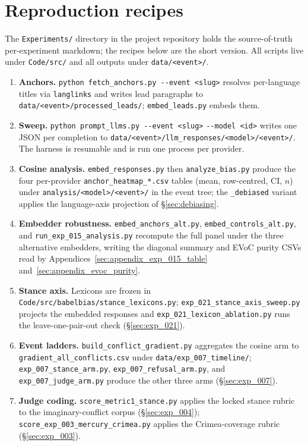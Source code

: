 \section{Reproduction recipes}\label{sec:appendix_reproduce}

The \verb|Experiments/| directory in the project repository holds
the source-of-truth per-experiment markdown; the recipes below are
the short version. All scripts live under \verb|Code/src/| and all
outputs under \verb|data/<event>/|.

{\sloppy
\begin{enumerate}
  \item \textbf{Anchors.} \verb|python fetch_anchors.py --event <slug>|
    resolves per-language titles via \verb|langlinks| and writes
    lead paragraphs to \verb|data/<event>/processed_leads/|;
    \verb|embed_leads.py| embeds them.
  \item \textbf{Sweep.} \verb|python prompt_llms.py --event <slug>|
    \verb|--model <id>| writes one JSON per completion to
    \verb|data/<event>/llm_responses/<model>/<event>/|. The harness
    is resumable and is run one process per provider.
  \item \textbf{Cosine analysis.} \verb|embed_responses.py| then
    \verb|analyze_bias.py| produce the four per-provider
    \verb|anchor_heatmap_*.csv| tables (mean, row-centred, CI,
    $n$) under \verb|analysis/<model>/<event>/| in the event
    tree; the
    \verb|_debiased| variant applies the language-axis projection
    of \S\ref{sec:debiasing}.
  \item \textbf{Embedder robustness.} \verb|embed_anchors_alt.py|,
    \verb|embed_controls_alt.py|, and
    \verb|run_exp_015_analysis.py| recompute the full panel under
    the three alternative embedders, writing the diagonal summary
    and EVoC purity CSVs read by
    Appendices~\ref{sec:appendix_exp_015_table}
    and~\ref{sec:appendix_evoc_purity}.
  \item \textbf{Stance axis.} Lexicons are frozen in
    \verb|Code/src/babelbias/stance_lexicons.py|;
    \verb|exp_021_stance_axis_sweep.py| projects the embedded
    responses and \verb|exp_021_lexicon_ablation.py| runs the
    leave-one-pair-out check (\S\ref{sec:exp_021}).
  \item \textbf{Event ladders.} \verb|build_conflict_gradient.py|
    aggregates the cosine arm to
    \verb|gradient_all_conflicts.csv| under
    \verb|data/exp_007_timeline/|;
    \verb|exp_007_stance_arm.py|, \verb|exp_007_refusal_arm.py|,
    and \verb|exp_007_judge_arm.py| produce the other three arms
    (\S\ref{sec:exp_007}).
  \item \textbf{Judge coding.} \verb|score_metric1_stance.py|
    applies the locked stance rubric to the imaginary-conflict
    corpus (\S\ref{sec:exp_004});
    \verb|score_exp_003_mercury_crimea.py| applies the
    Crimea-coverage rubric (\S\ref{sec:exp_003}).
\end{enumerate}\par}

